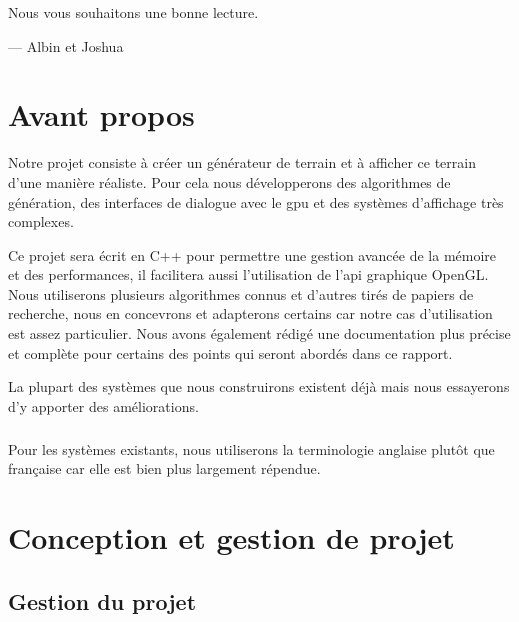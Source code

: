 \documentclass{EPUProjetDi}
\begin{document}
\setlength\epigraphrule{0pt}

\epigraph{Nous vous souhaitons une bonne lecture.}{ --- Albin et Joshua}





\chapter*{Avant propos} 


Notre projet consiste à créer un générateur de terrain et à afficher ce terrain d'une manière réaliste. Pour cela nous développerons des algorithmes de génération, des interfaces de dialogue avec le gpu et des systèmes d'affichage très complexes.

Ce projet sera écrit en C++ pour permettre une gestion avancée de la mémoire et des performances, il facilitera aussi l'utilisation de l'api graphique OpenGL.
Nous utiliserons plusieurs algorithmes connus et d'autres tirés de papiers de recherche, nous en concevrons et adapterons certains car notre cas d'utilisation est assez particulier.
Nous avons également rédigé une documentation plus précise et complète pour certains des points qui seront abordés dans ce rapport.  %

La plupart des systèmes que nous construirons existent déjà mais nous essayerons d'y apporter des améliorations.

\paragraph{}
Pour les systèmes existants, nous utiliserons la terminologie anglaise plutôt que française car elle est bien plus largement répendue.

\chapter{Conception et gestion de projet}

\section{Gestion du projet}

\paragraph{}
\end{document}
